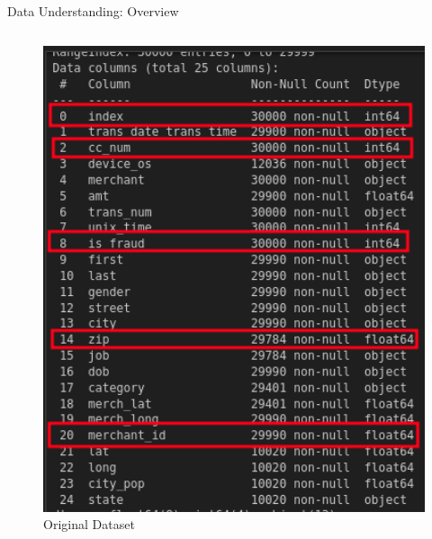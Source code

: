 \documentclass{beamer}
\begin{document}
\begin{frame}{Data Understanding: Overview}
\begin{columns}
      \begin{column}{0.4\textwidth}
        \begin{figure}
            \centering
            \includegraphics[width=1\textwidth]{images/dataset.png} %
            \caption{Original Dataset}
        \end{figure}
        \end{column}
    \end{columns}
\end{frame}
\end{document}

